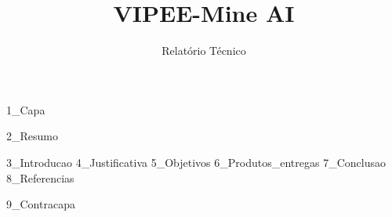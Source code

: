 \documentclass[a4paper,12pt,oneside]{book}
\title{VIPEE-Mine AI}
\subtitle{Relatório Técnico}
\begin{document}
\frontmatter

{1_Capa}

\pagestyle{empty}
{2_Resumo}

\listofquadros
\clearpage

\tableofcontents
\clearpage

\mainmatter
\pagestyle{fancy}

{3_Introducao}
{4_Justificativa}
{5_Objetivos}
{6_Produtos_entregas}
{7_Conclusao}
{8_Referencias}


\backmatter
{9_Contracapa}
\end{document}
